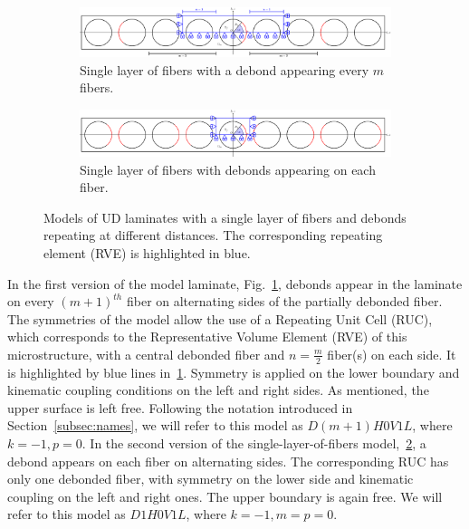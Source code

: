\documentclass[review]{elsarticle}
\begin{document}
\begin{figure}[!h]
\centering
    \begin{subfigure}[b]{\textwidth}
        \includegraphics[width=\textwidth]{freeThinPly.pdf}
        \caption{Single layer of fibers with a debond appearing every $m$ fibers.}\label{subfig:freethinply}
    \end{subfigure}

    \begin{subfigure}[b]{\textwidth}
        \includegraphics[width=\textwidth]{freeThinPlyAllDebonds.pdf}
        \caption{Single layer of fibers with debonds appearing on each fiber.}\label{subfig:freethinplyalldebonds}
    \end{subfigure} 

\caption{Models of UD laminates with a single layer of fibers and debonds repeating at different distances. The corresponding repeating element (RVE) is highlighted in blue.}\label{fig:laminateModelsA}
\end{figure}

In the first version of the model laminate, Fig.~\ref{subfig:freethinply}, debonds appear in the laminate on every $\left(m+1\right)^{th}$ fiber on alternating sides of the partially debonded fiber. The symmetries of the model allow the use of a Repeating Unit Cell (RUC), which corresponds to the Representative Volume Element (RVE) of this microstructure, with a central debonded fiber and $n=\frac{m}{2}$ fiber(s) on each side. It is highlighted by blue lines in~\ref{subfig:freethinply}. Symmetry is applied on the lower boundary and kinematic coupling conditions on the left and right sides. As mentioned, the upper surface is left free. Following the notation introduced in Section~\ref{subsec:names}, we will refer to this model as $D\left(m+1\right)H0V1L$, where $k=-1, p=0$. In the second version of the single-layer-of-fibers model,~\ref{subfig:freethinplyalldebonds}, a debond appears on each fiber on alternating sides. The corresponding RUC has only one debonded fiber, with symmetry on the lower side and kinematic coupling on the left and right ones. The upper boundary is again free. We will refer to this model as $D1H0V1L$, where $k=-1, m=p=0$.
\end{document}

